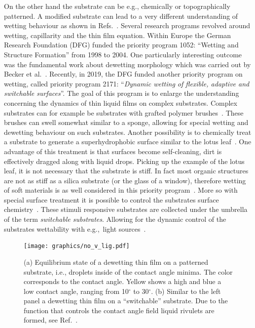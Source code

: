 On the other hand the substrate can be e.g., chemically or topographically patterned.
A modified substrate can lead to a very different understanding of wetting behaviour as shown in Refs.~\cite{cassieWettabilityPorousSurfaces1944, whymanRigorousDerivationYoung2008}.
Several research programs revolved around wetting, capillarity and the thin film equation. 
Within Europe the German Research Foundation (DFG) funded the priority program 1052: ``Wetting and Structure Formation'' from 1998 to 2004.
One particularly interesting outcome was the fundamental work about dewetting morphology which was carried out by Becker et al.~\cite{beckerComplexDewettingScenarios2003}. 
Recently, in 2019, the DFG funded another priority program on wetting, called priority program 2171: ``\textit{Dynamic wetting of flexible, adaptive and switchable surfaces}''. 
The goal of this program is to enlarge the understanding concerning the dynamics of thin liquid films on complex substrates.
Complex substrates can for example be substrates with grafted polymer brushes~\cite{thieleGradientDynamicsModel2020}.
These brushes can swell somewhat similar to a sponge, allowing for special wetting and dewetting behaviour on such substrates. 
Another possibility is to chemically treat a substrate to generate a superhydrophobic surface similar to the lotus leaf~\cite{liAdaptationStyreneAcrylic2021, wongMicrodropletContaminantsWhen2020}.
One advantage of this treatment is that surfaces become self-cleaning, dirt is effectively dragged along with liquid drops. 
Picking up the example of the lotus leaf, it is not necessary that the substrate is stiff.
In fact most organic structures are not as stiff as a silica substrate (or the glass of a window), therefore wetting of soft materials is as well considered in this priority program~\cite{andreottiStaticsDynamicsSoft2020, alandUnifiedNumericalModel2021, chenShortTimeWetting2011}.
More so with special surface treatment it is possible to control the substrates surface chemistry~\cite{xinReversiblySwitchableWettability2010, wangPhotoresponsiveSurfacesControllable2007}.
These stimuli responsive substrates are collected under the umbrella of the term \textit{switchable substrates}.
Allowing for the dynamic control of the substrates wettability with e.g.,~light sources~\cite{ichimuraLightDrivenMotionLiquids2000, sekiWideArrayPhotoinduced2018}.
\begin{figure}
    \centering
    \texttt{[image: graphics/no\_v\_lig.pdf]}
    \caption{(a) Equilibrium state of a dewetting thin film on a patterned substrate, i.e., droplets inside of the contact angle minima. 
    The color corresponds to the contact angle. 
    Yellow shows a high and blue a low contact angle, ranging from 10$^{\circ}$ to 30$^{\circ}$. 
    (b) Similar to the left panel a dewetting thin film on a ``switchable'' substrate. 
    Due to the function that controls the contact angle field liquid rivulets are formed, see Ref.~\cite{zitzControllingDewettingMorphologies2023}.}
    \label{fig:morph_transition}
\end{figure}
